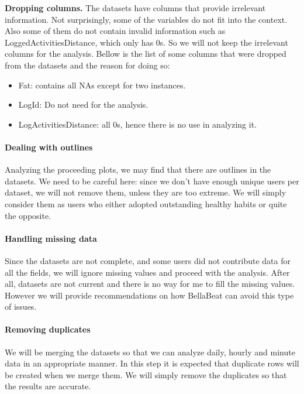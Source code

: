\documentclass[
]{article}
\providecommand{\tightlist}{%
  \setlength{\itemsep}{0pt}\setlength{\parskip}{0pt}}
\begin{document}
\textbf{Dropping columns.} The datasets have columns that provide
irrelevant information. Not surprisingly, some of the variables do not
fit into the context. Also some of them do not contain invalid
information such as LoggedActivitiesDistance, which only has 0s. So we
will not keep the irrelevant columns for the analysis. Bellow is the
list of some columns that were dropped from the datasets and the reason
for doing so:

\begin{itemize}
\tightlist
\item
  Fat: contains all NAs except for two instances.
\item
  LogId: Do not need for the analysis.
\item
  LogActivitiesDistance: all 0s, hence there is no use in analyzing it.
\end{itemize}

\hypertarget{dealing-with-outlines}{%
\paragraph{Dealing with outlines}\label{dealing-with-outlines}}

Analyzing the proceeding plots, we may find that there are outlines in
the datasets. We need to be careful here: since we don't have enough
unique users per dataset, we will not remove them, unless they are too
extreme. We will simply consider them as users who either adopted
outstanding healthy habits or quite the opposite.

\hypertarget{handling-missing-data}{%
\paragraph{Handling missing data}\label{handling-missing-data}}

Since the datasets are not complete, and some users did not contribute
data for all the fields, we will ignore missing values and proceed with
the analysis. After all, datasets are not current and there is no way
for me to fill the missing values. However we will provide
recommendations on how BellaBeat can avoid this type of issues.

\hypertarget{removing-duplicates}{%
\paragraph{Removing duplicates}\label{removing-duplicates}}

We will be merging the datasets so that we can analyze daily, hourly and
minute data in an appropriate manner. In this step it is expected that
duplicate rows will be created when we merge them. We will simply remove
the duplicates so that the results are accurate.
\end{document}
